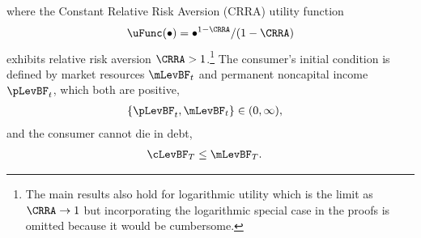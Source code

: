 \documentclass[BufferStockTheory]{subfiles}
\begin{document}
where the Constant Relative Risk Aversion (CRRA) utility function
\begin{align}
  \uFunc(\bullet)=\bullet^{1-\CRRA}/(1-\CRRA) \label{eq:crrautil}
\end{align}
exhibits relative risk aversion $\CRRA > 1$.\footnote{The main
  results also hold for logarithmic utility which is the limit as
  $\CRRA \rightarrow 1$ but incorporating the logarithmic special case
  in the proofs is omitted because it would be cumbersome.}  The consumer's initial condition is
defined by market resources $\mLevBF_{t}$ and permanent noncapital income $\pLevBF_{t}$, which
both are positive,
\begin{align}
  \{\pLevBF_{t},\mLevBF_{t}\} & \in (0,\infty) \label{eq:pLevBFandmLevBFgt0},
\end{align}
and the consumer cannot die in debt,
\begin{align}
  \cLevBF_{T} & \leq  \mLevBF_{T} \label{eq:NoDebtAtDeath}.
\end{align}

\hypertarget{checkRestrictions}{}
\end{document}
